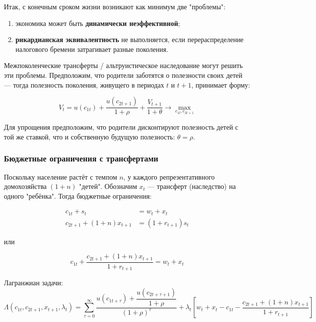 \documentclass[10pt,a4paper]{article}
\begin{document}
Итак, с конечным сроком жизни возникают как минимум две "проблемы":
\begin{enumerate}[leftmargin=1.5em]
\item экономика может быть \textbf{динамически неэффективной};
\item \textbf{рикардианская эквивалентность} не выполняется, если перераспределение налогового бремени затрагивает разные поколения.
\end{enumerate}

Межпоколенческие трансферты / альтруистическое наследование могут решить эти проблемы. Предположим, что родители заботятся о полезности своих детей — тогда полезность поколения, живущего в периодах $t$ и $t+1$, принимает форму:
\begin{formulabox}
\begin{equation}
V_t = u(c_{1t}) + \frac{u(c_{2t+1})}{1+\rho} + \frac{V_{t+1}}{1+\theta} \to \max_{c_{1t},c_{2t+1}} \tag{4.24}
\end{equation}
\end{formulabox}

Для упрощения предположим, что родители дисконтируют полезность детей с той же ставкой, что и собственную будущую полезность: $\theta = \rho$.

\subsubsection{Бюджетные ограничения с трансфертами}

Поскольку население растёт с темпом $n$, у каждого репрезентативного домохозяйства $(1+n)$ "детей". Обозначим $x_t$ — трансферт (наследство) на одного "ребёнка". Тогда бюджетные ограничения:
\begin{formulabox}
\begin{align}
c_{1t} + s_t &= w_t + x_t \tag{4.25}\\
c_{2t+1} + (1+n)x_{t+1} &= (1+r_{t+1})s_t \tag{4.26}
\end{align}
\end{formulabox}
или
\begin{formulabox}
\begin{equation}
c_{1t} + \frac{c_{2t+1} + (1+n)x_{t+1}}{1+r_{t+1}} = w_t + x_t \tag{4.27}
\end{equation}
\end{formulabox}

Лагранжиан задачи:
$$\Lambda(c_{1t}, c_{2t+1}, x_{t+1}, \lambda_t) = \sum_{\tau=0}^{\infty} \frac{u(c_{1t+\tau}) + \dfrac{u(c_{2t+\tau+1})}{1+\rho}}{(1+\rho)^\tau} + \lambda_t\left[w_t + x_t - c_{1t} - \frac{c_{2t+1}+(1+n)x_{t+1}}{1+r_{t+1}}\right]$$
\end{document}
